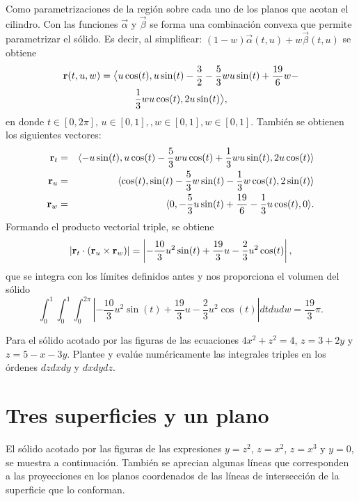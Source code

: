 Como parametrizaciones de la región sobre cada uno de los planos que acotan el cilindro. Con las funciones
$\overrightarrow{\alpha}$ y $\overrightarrow{\beta}$ se forma una combinación convexa que permite parametrizar el sólido. Es decir, al simplificar:
$(1-w)\overrightarrow{\alpha}(t,u)+w\overrightarrow{\beta}(t,u)$
se obtiene
\begin{multline*}
{\bf r}( t,u,w) = \big \langle u\cos (t),u\sin(t)-\frac{3}{2}-\frac{5}{3}wu\sin (t)+\frac{19}{6}w- \\ \frac{1}{3}wu\cos (t),2u\sin (t) \big \rangle,
\end{multline*}
%
en donde $t\in[0, 2\pi],\, u\in[0, 1],, w\in[0, 1], w\in[0, 1]$. También se obtienen los siguientes vectores:
{\small
\begin{eqnarray*}
{\bf r}_{t} &=& \langle -u\sin (t),u\cos (t)-\frac{5}{3}wu\cos (t)+\frac{1}{3}wu\sin (t),2u\cos (t)\rangle \\
{\bf r}_{u}&=& \langle \cos (t),\sin (t)-\frac{5}{3}w\sin (t)-\frac{1}{3}w\cos (t),2\sin (t)\rangle \\
{\bf r}_{w}&=& \langle 0,-\frac{5}{3}u\sin (t)+\frac{19}{6}-\frac{1}{3}u\cos (t),0\rangle.
\end{eqnarray*}
}
%
Formando el producto vectorial triple, se obtiene
%
\[| {\bf r}_{t}\cdot ( {\bf r}_{u}\times {\bf r}_{w}) | = \left| -\frac{10}{3}u^2\sin (t)+\frac{19}{3}u-\frac{2}{3}u^2\cos (t)\right |,\]
%
que se integra con los límites definidos antes y nos proporciona el volumen del sólido
%
\[\int_{0}^{1}\int_{0}^{1}\int_{0}^{2\pi }\left | -\frac{10}{3}u^2\sin (t)
+\frac{19}{3}u-\frac{2}{3}u^2\cos (t)\right | dtdudw= \frac{19}{3}\pi.\]

\begin{ejer}
Para el sólido acotado por las figuras de las ecuaciones $4x^2 + z^2 = 4$, $z = 3 + 2y$ y $z = 5 -x-3y$. Plantee y evalúe numéricamente las integrales triples en los órdenes $dzdxdy$ y $dxdydz$.
\end{ejer}

\section{Tres superficies y un plano}

El sólido acotado por las figuras de las expresiones $y=z^2$, $z=x^2$, $z=x^3$ y $y=0$,
se muestra a continuación. También se aprecian algunas líneas que corresponden a las proyecciones en los planos coordenados de las líneas de intersección de la superficie que lo conforman.


